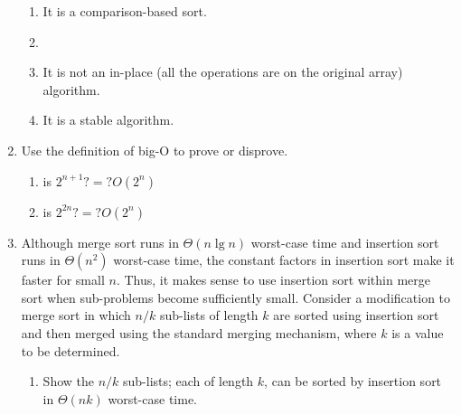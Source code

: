 \documentclass[12pt]{report}
\newcommand{\choicelabel}{\alph*)}
\begin{document}
\begin{enumerate}[label=\arabic*.]
	\begin{enumerate}[label=\choicelabel]
	    \item It is a comparison-based sort.
		\item {}
		\item It is not an in-place (all the operations are on the original array) algorithm.
		\item It is a stable algorithm.
	\end{enumerate}
	\item Use the definition of big-O to prove or disprove.
	\begin{enumerate}[label=\arabic{enumi}\choicelabel]
	    \item is $2^{n+1}?=?O\left( 2^{n} \right)$
	    \item is $2^{2n}?=?O\left( 2^{n} \right)$
	\end{enumerate}
	\item Although merge sort runs in $\Theta(n\lg n)$ worst-case time and insertion sort runs in $\Theta(n^{2})$ worst-case time, the constant factors in insertion sort make it faster for small $n$. Thus, it makes sense to use insertion sort within merge sort when sub-problems become sufficiently small. Consider a modification to merge sort in which $n/k$ sub-lists of length $k$ are sorted using insertion sort and then merged using the standard merging mechanism, where $k$ is a value to be determined.
	\begin{enumerate}[label=\arabic{enumi}\choicelabel]
	    \item Show the $n/k$ sub-lists; each of length $k$, can be sorted by insertion sort in $\Theta(nk)$ worst-case time.\answer{\begin{equation*}

\end{equation*}}
\end{enumerate}
\end{enumerate}
\end{document}
